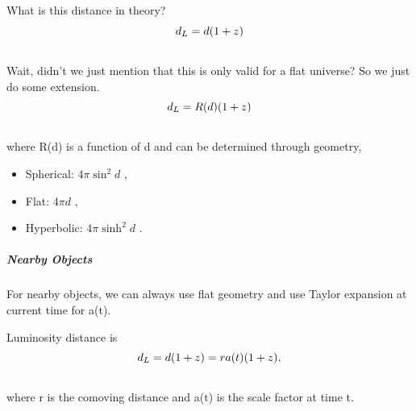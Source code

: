 \documentclass[letterpaper,10pt,english]{sphinxmanual}
\begin{document}
What is this distance in theory?
\begin{gather}
\begin{split}d_L = d (1+z)\end{split}\notag\\\begin{split}\end{split}\notag
\end{gather}
Wait, didn't we just mention that this is only valid for a flat universe? So we just do some extension.
\begin{gather}
\begin{split}d_L = R(d) (1+z)\end{split}\notag\\\begin{split}\end{split}\notag
\end{gather}
where R(d) is a function of d and can be determined through geometry,
\begin{itemize}
\item {} 
Spherical: $4\pi \sin^2 d$ ,

\item {} 
Flat: $4\pi d$ ,

\item {} 
Hyperbolic: $4\pi \sinh^2 d$ .

\end{itemize}


\subparagraph{Nearby Objects}
\label{Cosmology/cosmoIndex:nearby-objects}
For nearby objects, we can always use flat geometry and use Taylor expansion at current time for a(t).

Luminosity distance is
\begin{gather}
\begin{split}d_L = d (1+z) = r a(t) (1+z) ,\end{split}\notag\\\begin{split}\end{split}\notag
\end{gather}
where r is the comoving distance and a(t) is the scale factor at time t.
\end{document}
